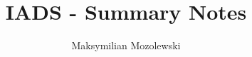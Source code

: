 \documentclass{article}
\begin{document}
\title{IADS - Summary Notes}
\author{Maksymilian Mozolewski}
\maketitle
\pagebreak
\tableofcontents
\pagebreak




\end{document}
